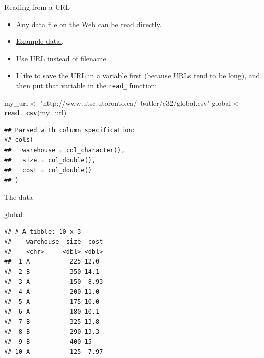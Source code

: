 \documentclass[ignorenonframetext,]{beamer}
\newenvironment{Shaded}{\begin{snugshade}}{\end{snugshade}}
\newcommand{\KeywordTok}[1]{\textcolor[rgb]{0.13,0.29,0.53}{\textbf{#1}}}
\newcommand{\NormalTok}[1]{#1}
\newcommand{\StringTok}[1]{\textcolor[rgb]{0.31,0.60,0.02}{#1}}
\providecommand{\tightlist}{%
  \setlength{\itemsep}{0pt}\setlength{\parskip}{0pt}}
\begin{document}
\begin{frame}[fragile]{Reading from a URL}
\protect\hypertarget{reading-from-a-url}{}

\begin{itemize}
\tightlist
\item
  Any data file on the Web can be read directly.
\item
  \href{http://www.utsc.utoronto.ca/~butler/c32/global.csv}{Example
  data:}.
\item
  Use URL instead of filename.
\item
  I like to save the URL in a variable first (because URLs tend to be
  long), and then put that variable in the \texttt{read\_} function:
\end{itemize}

\begin{Shaded}
\begin{Highlighting}[]
\NormalTok{my_url <-}\StringTok{ "http://www.utsc.utoronto.ca/~butler/c32/global.csv"}
\NormalTok{global <-}\StringTok{ }\KeywordTok{read_csv}\NormalTok{(my_url)}
\end{Highlighting}
\end{Shaded}

\begin{verbatim}
## Parsed with column specification:
## cols(
##   warehouse = col_character(),
##   size = col_double(),
##   cost = col_double()
## )
\end{verbatim}

\end{frame}

\begin{frame}[fragile]{The data}
\protect\hypertarget{the-data}{}

\begin{Shaded}
\begin{Highlighting}[]
\NormalTok{global}
\end{Highlighting}
\end{Shaded}

\begin{verbatim}
## # A tibble: 10 x 3
##    warehouse  size  cost
##    <chr>     <dbl> <dbl>
##  1 A           225 12.0 
##  2 B           350 14.1 
##  3 A           150  8.93
##  4 A           200 11.0 
##  5 A           175 10.0 
##  6 A           180 10.1 
##  7 B           325 13.8 
##  8 B           290 13.3 
##  9 B           400 15   
## 10 A           125  7.97
\end{verbatim}

\end{frame}
\end{document}
